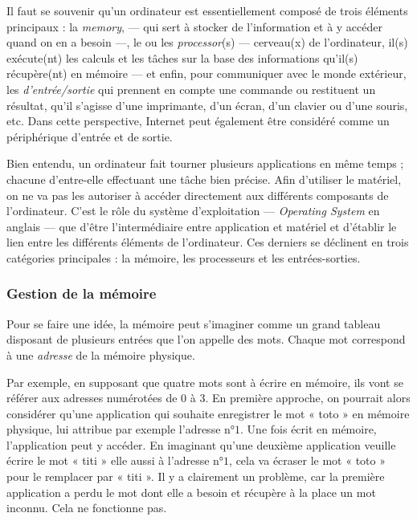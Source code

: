 Il faut se souvenir qu'un ordinateur est essentiellement composé de trois éléments principaux : la \emph{\gls{memory}}, --- qui sert à stocker de l'information et à y accéder quand on en a besoin ---, le ou les \emph{\gls{processor}}(s) --- cerveau(x) de l'ordinateur, il(s) exécute(nt) les calculs et les tâches sur la base des informations qu'il(s) récupère(nt) en mémoire --- et enfin, pour communiquer avec le monde extérieur, les \emph{ d'entrée/sortie} qui prennent en compte une commande ou restituent un résultat, qu'il s'agisse d'une imprimante, d'un écran, d'un clavier ou d'une souris, etc. Dans cette perspective, Internet peut également être considéré comme un périphérique d'entrée et de sortie.

Bien entendu, un ordinateur fait tourner plusieurs \glspl{application} en même temps ; chacune d'entre-elle effectuant une tâche bien précise. Afin d'utiliser le matériel, on ne va pas les autoriser à accéder directement aux différents composants de l'ordinateur. C'est le rôle du système d'exploitation --- \textit{Operating System} en anglais --- que d'être l’intermédiaire entre \gls{application} et matériel et d'établir le lien entre les différents éléments de l'ordinateur. Ces derniers se déclinent en trois catégories principales : la mémoire, les processeurs et les entrées-sorties.

\subsubsection[Gestion mémoire]{Gestion de la mémoire}
\label{subsub:I.2.1.1}

Pour se faire une idée, la mémoire peut s'imaginer comme un grand tableau disposant de plusieurs entrées que l'on appelle des mots. Cha\-que mot correspond à une \textit{adresse} de la mémoire physique. 

Par exemple, en supposant que quatre mots sont à écrire en mémoire, ils vont se référer aux adresses numérotées de $0$ à $3$. En première approche, on pourrait alors considérer qu'une application qui souhaite enregistrer le mot « toto » en mémoire physique, lui attribue par exemple l'adresse n°$1$. Une fois écrit en mémoire, l'application peut y accéder. En imaginant qu'une deuxième application veuille écrire le mot « titi » elle aussi à l'adresse n°$1$, cela va écraser le mot « toto » pour le remplacer par « titi ». Il y a clairement un problème, car la première application a perdu le mot dont elle a besoin et récupère à la place un mot inconnu. Cela ne fonctionne pas.

